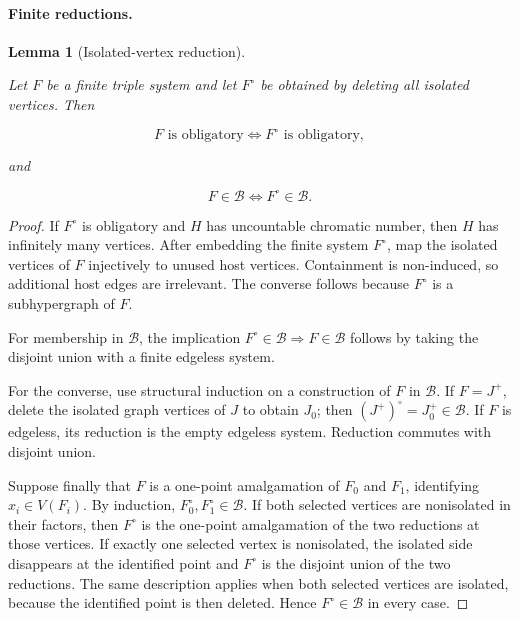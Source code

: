 \documentclass[a4paper,11pt,reqno]{amsart}
\theoremstyle{plain}
\newtheorem{lemma}[theorem]{Lemma}
\theoremstyle{definition}
\theoremstyle{remark}
\begin{document}
\paragraph{Finite reductions.}\label{finite-reductions}

\begin{lemma}[Isolated-vertex reduction]\label{lemma-1.1-isolated-vertex-reduction}

Let \(F\) be a finite triple system and let \(F^\circ\) be obtained by deleting all isolated vertices. Then

\[
F\text{ is obligatory}\iff F^\circ\text{ is obligatory},
\]

and

\[
F\in\mathcal B\iff F^\circ\in\mathcal B.
\]

\end{lemma}
\begin{proof}
If \(F^\circ\) is obligatory and \(H\) has uncountable chromatic number, then \(H\) has infinitely many vertices. After embedding the finite system \(F^\circ\), map the isolated vertices of \(F\) injectively to unused host vertices. Containment is non-induced, so additional host edges are irrelevant. The converse follows because \(F^\circ\) is a subhypergraph of \(F\).

For membership in \(\mathcal B\), the implication \(F^\circ\in\mathcal B\Rightarrow F\in\mathcal B\) follows by taking the disjoint union with a finite edgeless system.

For the converse, use structural induction on a construction of \(F\) in \(\mathcal B\). If \(F=J^+\), delete the isolated graph vertices of \(J\) to obtain \(J_0\); then \((J^+)^\circ=J_0^+\in\mathcal B\). If \(F\) is edgeless, its reduction is the empty edgeless system. Reduction commutes with disjoint union.

Suppose finally that \(F\) is a one-point amalgamation of \(F_0\) and
\(F_1\), identifying \(x_i\in V(F_i)\). By induction,
\(F_0^\circ,F_1^\circ\in\mathcal B\). If both selected vertices are
nonisolated in their factors, then \(F^\circ\) is the one-point amalgamation
of the two reductions at those vertices. If exactly one selected vertex is
nonisolated, the isolated side disappears at the identified point and
\(F^\circ\) is the disjoint union of the two reductions. The same description
applies when both selected vertices are isolated, because the identified
point is then deleted. Hence \(F^\circ\in\mathcal B\) in every case.
\end{proof}
\end{document}
